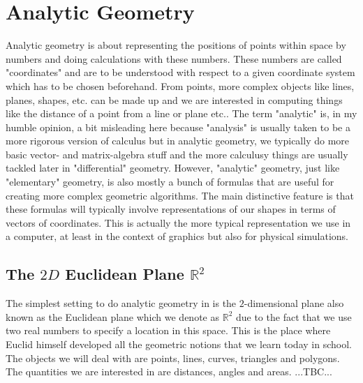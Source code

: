 \section{Analytic Geometry}
Analytic geometry is about representing the positions of points within space by numbers and doing calculations with these numbers. These numbers are called "coordinates" and are to be understood with respect to a given coordinate system which has to be chosen beforehand. From points, more complex objects like lines, planes, shapes, etc. can be made up and we are interested in computing things like the distance of a point from a line or plane etc.. The term "analytic" is, in my humble opinion, a bit misleading here because "analysis" is usually taken to be a more rigorous version of calculus but in analytic geometry, we typically do more basic vector- and matrix-algebra stuff and the more calculusy things are usually tackled later in "differential" geometry. However, "analytic" geometry, just like "elementary" geometry, is also mostly a bunch of formulas that are useful for creating more complex geometric algorithms. The main distinctive feature is that these formulas will typically involve representations of our shapes in terms of vectors of coordinates. This is actually the more typical representation we use in a computer, at least in the context of graphics but also for physical simulations. 

\subsection{The $2D$ Euclidean Plane $\mathbb{R}^2$}
The simplest setting to do analytic geometry in is the $2$-dimensional plane also known as the Euclidean plane which we denote as $\mathbb{R}^2$ due to the fact that we use two real numbers to specify a location in this space. This is the place where Euclid himself developed all the geometric notions that we learn today in school. The objects we will deal with are points, lines, curves, triangles and polygons. The quantities we are interested in are distances, angles and areas. ...TBC...


